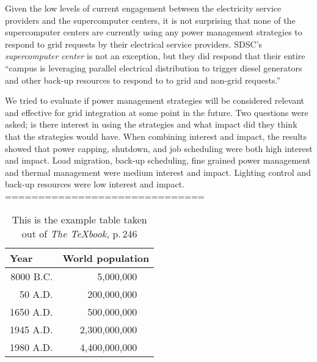 \documentclass{llncs}
\begin{document}
Given the low levels of current engagement between the electricity service
providers and the supercomputer centers, it is not surprising that none of
the supercomputer centers are currently using any power management
strategies to respond to grid requests by their electrical service
providers. SDSC's \textit{supercomputer center} is not an exception, but they did respond that their
entire ``campus is leveraging parallel electrical distribution to trigger
diesel generators and other back-up resources to respond to to grid and
non-grid requests.''

We tried to evaluate if power management strategies will be considered
relevant and effective for grid integration at some point in the future. Two
questions were asked; is there interest in using the strategies and what
impact did they think that the strategies would have. When combining
interest and impact, the results showed that power capping, shutdown, and
job scheduling were both high interest and impact. Load migration, back-up
scheduling, fine grained power management and thermal management were medium
interest and impact. Lighting control and back-up resources were low
interest and impact.
==============================

\begin{table}
\caption{This is the example table taken out of {\it The
\TeX{}book,} p.\,246}
\begin{center}
\begin{tabular}{r@{\quad}rl}
\hline
\multicolumn{1}{l}{\rule{0pt}{12pt}
                   Year}&\multicolumn{2}{l}{World 
population}\\[2pt]
\hline\rule{0pt}{12pt}
8000 B.C.  &     5,000,000& \\
  50 A.D.  &   200,000,000& \\
1650 A.D.  &   500,000,000& \\
1945 A.D.  & 2,300,000,000& \\
1980 A.D.  & 4,400,000,000& \\[2pt]
\hline
\end{tabular}
\end{center}
\end{table}
%
\end{document}
